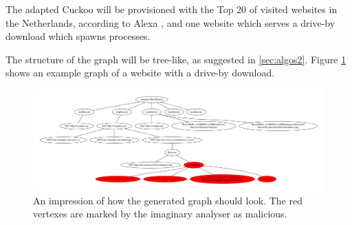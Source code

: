 The adapted Cuckoo will be provisioned with the Top 20 of visited websites in the Netherlands, according to Alexa \cite{http://www.alexa.com/topsites/countries/NL}, and one website which serves a drive-by download which spawns processes.

The structure of the graph will be tree-like, as suggested in \ref{sec:algos2}. Figure \ref{fig:alg_tree} shows an example graph of a website with a drive-by download.

\begin{figure}[h]
    \centering
    \centerline{\includegraphics[width=19cm]{Images/alg_tree}}
    \caption{An impression of how the generated graph should look. The red vertexes are marked by the imaginary analyser as malicious.}
    \label{fig:alg_tree}
\end{figure}

